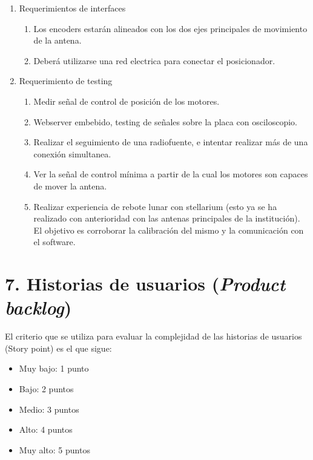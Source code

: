 \documentclass[11pt, %
codirector, %
]{charter}
\begin{document}
\begin{enumerate}
	\item Requerimientos de interfaces
		\begin{enumerate}
			\item Los encoders estarán alineados con los dos ejes principales de movimiento de la antena. 
			\item Deberá utilizarse una red electrica para conectar el posicionador.
		\end{enumerate}
	\item Requerimiento de testing
		\begin{enumerate}
			\item Medir señal de control de posición de los motores.
			\item Webserver embebido, testing de señales sobre la placa con osciloscopio.
			\item Realizar el seguimiento de una radiofuente, e intentar realizar más de una conexión simultanea. 
			\item Ver la señal de control mínima a partir de la cual los motores son capaces de mover la antena. 
			\item Realizar experiencia de rebote lunar con stellarium (esto ya se ha realizado con anterioridad con las antenas principales de la institución). El objetivo es corroborar la calibración del mismo y la comunicación con el software.  

		\end{enumerate}
\end{enumerate}

\section{7. Historias de usuarios (\textit{Product backlog})}
\label{sec:backlog}

%
%
%
El criterio que se utiliza para evaluar la complejidad de las  historias de usuarios (Story point) es el que sigue:
\begin{itemize}
	\item Muy bajo: 1 punto 
	\item Bajo: 2 puntos
	\item Medio: 3 puntos 
	\item Alto: 4 puntos 
	\item Muy alto: 5 puntos
\end{itemize}
\end{document}
